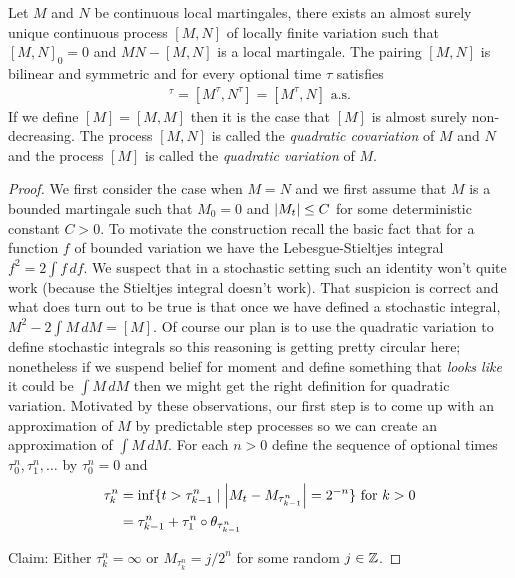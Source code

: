 \begin{thm}\label{OptionalQuadraticCovariation}Let $M$ and $N$ be continuous local martingales, there exists an almost surely unique continuous process $[M,N]$ of locally finite variation such that $[M,N]_0 = 0$ and $MN - [M,N]$ is a local martingale.  The pairing $[M,N]$ is bilinear and symmetric and for every optional time $\tau$ satisfies
\begin{align*}
[M,N]^\tau = [M^\tau, N^\tau] = [M^\tau, N] \text{ a.s.}
\end{align*}
If we define $[M] = [M,M]$ then it is the case that $[M]$ is almost surely non-decreasing.  The process $[M,N]$ is called the \emph{quadratic covariation} of $M$ and $N$ and the process $[M]$ is called the \emph{quadratic variation} of $M$.
\end{thm}
\begin{proof}
We first consider the case when $M=N$ and we first assume that $M$ is a bounded martingale such that $M_0=0$ and $\left \vert M_t \right \vert \leq C$ for some deterministic constant $C > 0$.  To motivate the construction recall the basic fact that for a function $f$ of bounded variation we have the Lebesgue-Stieltjes integral $f^2 = 2 \int f \, df$.  We suspect that in a stochastic setting such an identity won't quite work (because the Stieltjes integral doesn't work).  That suspicion is correct and what does turn out to be true is that once we have defined a stochastic integral, $M^2 - 2 \int M \, dM = [M]$.  Of course our plan is to use the quadratic variation to define stochastic integrals so this reasoning is getting pretty circular here; nonetheless if we suspend belief for moment and define something that \emph{looks like} it could be $\int M \, dM$ then we might get the right definition for quadratic variation.  Motivated by these observations, our first step is to come up with an approximation of $M$ by predictable step processes so we can create an approximation of $\int M \, dM$.  For each $n > 0$ define the sequence of optional times $\tau^n_0, \tau^n_1, \dotsc$ by $\tau^n_0 = 0$ and 
\begin{align*} 
\tau^n_k &= \inf \lbrace t > \tau^n_{k-1} \mid \left \vert M_t - M_{\tau^n_{k-1}} \right \vert = 2^{-n} \rbrace \text{ for $k > 0$} \\
&=\tau^n_{k-1} + \tau^n_1 \circ \theta_{\tau^n_{k-1}}
\end{align*}

Claim: Either $\tau^n_k = \infty$ or $M_{\tau^n_k} = j/2^n$ for some random $j \in \mathbb{Z}$.


\end{proof}
